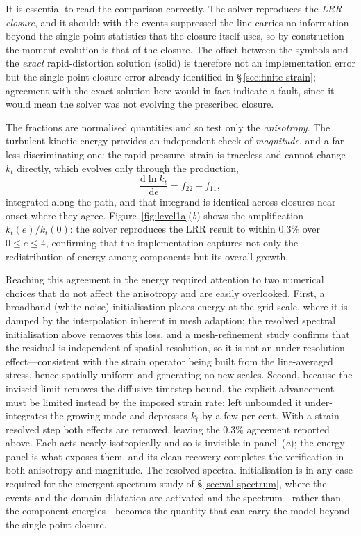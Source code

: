 \documentclass[lineno]{JFM-FLM_Au}
\begin{document}
It is essential to read the comparison correctly. The solver reproduces the
\emph{LRR closure}, and it should: with the events suppressed the line
carries no information beyond the single-point statistics that the closure
itself uses, so by construction the moment evolution is that of the closure.
The offset between the symbols and the \emph{exact} rapid-distortion
solution (solid) is therefore not an implementation error but the
single-point closure error already identified in \S\,\ref{sec:finite-strain};
agreement with the exact solution here would in fact indicate a fault, since
it would mean the solver was not evolving the prescribed closure.

The fractions are normalised quantities and so test only the
\emph{anisotropy}. The turbulent kinetic energy provides an independent
check of \emph{magnitude}, and a far less discriminating one: the rapid
pressure--strain is traceless and cannot change $k_t$ directly, which
evolves only through the production,
\begin{equation}
  \frac{\mathrm{d}\ln k_t}{\mathrm{d}e} = f_{22} - f_{11},
  \label{eq:dlnkt}
\end{equation}
integrated along the path, and that integrand is identical
across closures near onset where they agree.
Figure~\ref{fig:level1a}(\textit{b}) shows the amplification
$k_t(e)/k_t(0)$: the solver reproduces the LRR result to within $0.3\%$ over
$0\le e\le4$, confirming that the implementation captures not only the
redistribution of energy among components but its overall growth.
 
Reaching this agreement in the energy required attention to two numerical
choices that do not affect the anisotropy and are easily overlooked. First,
a broadband (white-noise) initialisation places energy at the grid scale,
where it is damped by the interpolation inherent in mesh adaption; the
resolved spectral initialisation above removes this loss, and a
mesh-refinement study confirms that the residual is independent of spatial
resolution, so it is not an under-resolution effect---consistent with the
strain operator being built from the line-averaged stress, hence spatially
uniform and generating no new scales. Second, because the inviscid limit
removes the diffusive timestep bound, the explicit advancement must be
limited instead by the imposed strain rate; left unbounded it
under-integrates the growing mode and depresses $k_t$ by a few per cent.
With a strain-resolved step both effects are removed, leaving the $0.3\%$
agreement reported above. Each acts nearly isotropically and so is invisible
in panel~(\textit{a}); the energy panel is what exposes them, and its clean
recovery completes the verification in both anisotropy and magnitude. The
resolved spectral initialisation is in any case required for the
emergent-spectrum study of \S\,\ref{sec:val-spectrum}, where the events and
the domain dilatation are activated and the spectrum---rather than the
component energies---becomes the quantity that can carry the model beyond the
single-point closure.
\end{document}

